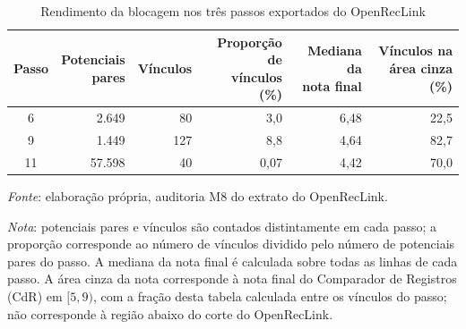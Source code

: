 \begin{table}[htbp]
\centering
\caption{Rendimento da blocagem nos três passos exportados do OpenRecLink}
\label{tab:blocagem-rendimento}
\small
\setlength{\tabcolsep}{4pt}
\begin{tabular}{crrrrr}
\toprule
Passo & \shortstack{Potenciais\\pares} & Vínculos & \shortstack{Proporção de\\vínculos (\%)} & \shortstack{Mediana da\\nota final} & \shortstack{Vínculos na\\área cinza (\%)} \\
\midrule
6  & 2.649  & 80  & 3,0  & 6,48 & 22,5 \\
9  & 1.449  & 127 & 8,8  & 4,64 & 82,7 \\
11 & 57.598 & 40  & 0,07 & 4,42 & 70,0 \\
\bottomrule
\end{tabular}

\smallskip
{\footnotesize\textit{Fonte}: elaboração própria, auditoria M8 do extrato do OpenRecLink.
\par\textit{Nota}: potenciais pares e vínculos são contados distintamente em cada passo; a proporção corresponde ao número de vínculos dividido pelo número de potenciais pares do passo. A mediana da nota final é calculada sobre todas as linhas de cada passo. A área cinza da nota corresponde à nota final do Comparador de Registros (CdR) em $[5,9)$, com a fração desta tabela calculada entre os vínculos do passo; não corresponde à região abaixo do corte do OpenRecLink.}
\end{table}
